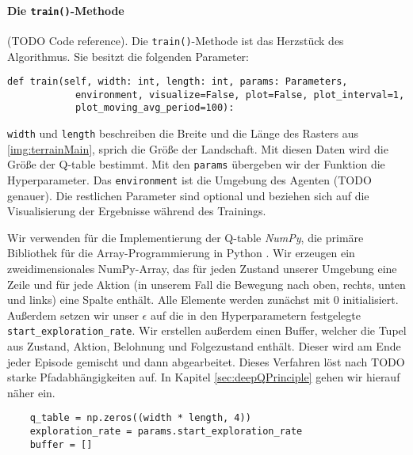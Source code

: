 \paragraph{Die \texttt{train()}-Methode}
(TODO Code reference). Die \texttt{train()}-Methode ist das Herzstück des Algorithmus. Sie besitzt die folgenden Parameter:
\begin{verbatim}
def train(self, width: int, length: int, params: Parameters,
            environment, visualize=False, plot=False, plot_interval=1,
            plot_moving_avg_period=100):
\end{verbatim}
\texttt{width} und \texttt{length} beschreiben die Breite und die Länge des Rasters aus \ref{img:terrainMain}, sprich die Größe der Landschaft. Mit diesen Daten wird die Größe der Q-table bestimmt. Mit den \texttt{params} übergeben wir der Funktion die Hyperparameter. Das \texttt{environment} ist die Umgebung des Agenten (TODO genauer). Die restlichen Parameter sind optional und beziehen sich auf die Visualisierung der Ergebnisse während des Trainings.

Wir verwenden für die Implementierung der Q-table \textit{NumPy}, die primäre Bibliothek für die Array-Programmierung in Python \cite{harris2020array}. Wir erzeugen ein zweidimensionales NumPy-Array, das für jeden Zustand unserer Umgebung eine Zeile und für jede Aktion (in unserem Fall die Bewegung nach oben, rechts, unten und links) eine Spalte enthält. Alle Elemente werden zunächst mit 0 initialisiert. Außerdem setzen wir unser $ \epsilon $ auf die in den Hyperparametern festgelegte \texttt{start_exploration_rate}. Wir erstellen außerdem einen Buffer, welcher die Tupel aus Zustand, Aktion, Belohnung und Folgezustand enthält. Dieser wird am Ende jeder Episode gemischt und dann abgearbeitet. Dieses Verfahren löst nach TODO starke Pfadabhängigkeiten auf. In Kapitel \ref{sec:deepQPrinciple} gehen wir hierauf näher ein.
\begin{verbatim}
    q_table = np.zeros((width * length, 4))
    exploration_rate = params.start_exploration_rate
    buffer = []
\end{verbatim}

